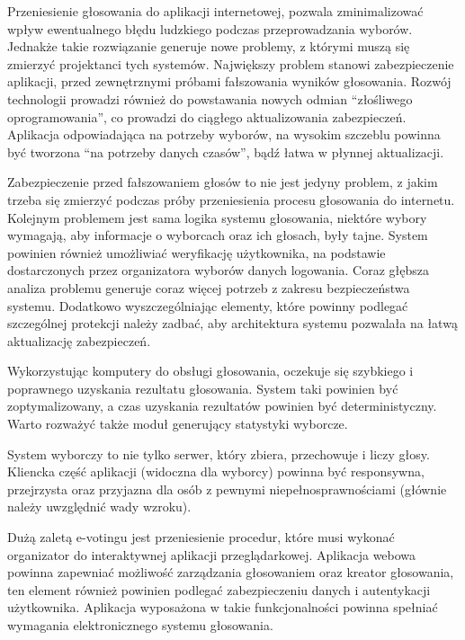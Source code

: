 \documentclass{report}
\begin{document}
Przeniesienie głosowania do aplikacji internetowej, pozwala zminimalizować wpływ ewentualnego błędu ludzkiego podczas przeprowadzania wyborów. Jednakże takie rozwiązanie generuje nowe problemy, z którymi muszą się zmierzyć projektanci tych systemów. Największy problem stanowi zabezpieczenie aplikacji, przed zewnętrznymi próbami fałszowania wyników głosowania. Rozwój technologii prowadzi również do powstawania nowych odmian “złośliwego oprogramowania”, co prowadzi do ciągłego aktualizowania zabezpieczeń. Aplikacja odpowiadająca na potrzeby wyborów, na wysokim szczeblu powinna być tworzona “na potrzeby danych czasów”, bądź łatwa w płynnej aktualizacji.

Zabezpieczenie przed fałszowaniem głosów to nie jest jedyny problem, z jakim trzeba się zmierzyć podczas próby przeniesienia procesu głosowania do internetu. Kolejnym problemem jest sama logika systemu głosowania, niektóre wybory wymagają, aby informacje o wyborcach oraz ich głosach, były tajne. System powinien również umożliwiać weryfikację użytkownika, na podstawie dostarczonych przez organizatora wyborów danych logowania. Coraz głębsza analiza problemu generuje coraz więcej potrzeb z zakresu bezpieczeństwa systemu. Dodatkowo wyszczególniając elementy, które powinny podlegać szczególnej protekcji należy zadbać, aby architektura systemu pozwalała na łatwą aktualizację zabezpieczeń.

Wykorzystując komputery do obsługi głosowania, oczekuje się szybkiego i poprawnego uzyskania rezultatu głosowania. System taki powinien być zoptymalizowany, a czas uzyskania rezultatów powinien być deterministyczny. Warto rozważyć także moduł generujący statystyki wyborcze.

System wyborczy to nie tylko serwer, który zbiera, przechowuje i liczy głosy. Kliencka część aplikacji (widoczna dla wyborcy) powinna być responsywna, przejrzysta oraz przyjazna dla osób z pewnymi niepełnosprawnościami (głównie należy uwzględnić wady wzroku).

Dużą zaletą e-votingu jest przeniesienie procedur, które musi wykonać organizator do interaktywnej aplikacji przeglądarkowej. Aplikacja webowa powinna zapewniać możliwość zarządzania głosowaniem oraz kreator głosowania, ten element również powinien podlegać zabezpieczeniu danych i autentykacji użytkownika. Aplikacja wyposażona w takie funkcjonalności powinna spełniać wymagania elektronicznego systemu głosowania.
\end{document}
